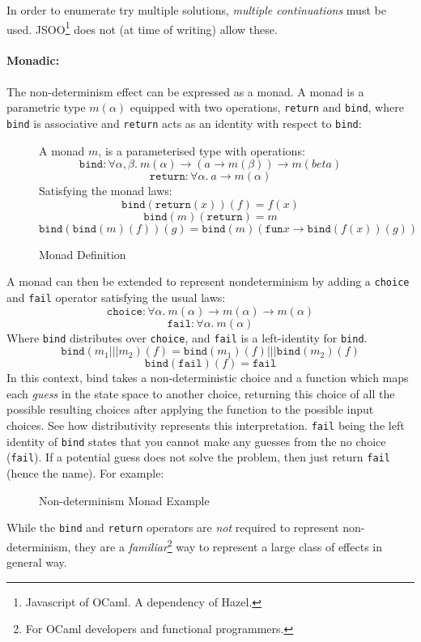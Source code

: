In order to enumerate try multiple solutions, \textit{multiple continuations} must be used. JSOO\footnote{Javascript of OCaml. A dependency of Hazel.} does not (at time of writing) allow these.
\paragraph{Monadic:} The non-determinism effect can be expressed as a monad. A monad is a parametric type $m(\alpha)$ equipped with two operations, \texttt{return} and \texttt{bind}, where \texttt{bind} is associative and \texttt{return} acts as an identity with respect to \texttt{bind}:
\begin{figure}[h]
A monad $m$, is a parameterised type with operations:
\[\texttt{bind} : \forall \alpha, \beta.\ m(\alpha) \to (a \to m(\beta)) \to m(beta)\]
\[\texttt{return} : \forall \alpha.\ a \to m(\alpha)\]
Satisfying the monad laws:
\[\texttt{bind}(\texttt{return}(x))(f) = f(x)\]
\[\texttt{bind}(m)(\texttt{return}) = m\]
\[\texttt{bind}(\texttt{bind}(m)(f))(g) = \texttt{bind}(m)(\texttt{fun} x \to \texttt{bind}(f(x))(g))\]
\caption{Monad Definition}
\end{figure}
A monad can then be extended to represent nondeterminism by adding a \texttt{choice} and \texttt{fail} operator satisfying the usual laws:
\[\texttt{choice} : \forall \alpha.\ m(\alpha) \to m(\alpha) \to m(\alpha)\]
\[\texttt{fail} : \forall \alpha.\ m(\alpha)\]
Where \texttt{bind} distributes over \texttt{choice}, and \texttt{fail} is a left-identity for \texttt{bind}.
\[\texttt{bind}(m_1 \texttt{|||} m_2)(f) = \texttt{bind}(m_1)(f) \texttt{|||} \texttt{bind}(m_2)(f)\]
\[\texttt{bind}(\texttt{fail})(f) = \texttt{fail}\]
In this context, bind takes a non-deterministic choice and a function which maps each \textit{guess} in the state space to another choice, returning this choice of all the possible resulting choices after applying the function to the possible input choices. See how distributivity represents this interpretation. \texttt{fail} being the left identity of \texttt{bind} states that you cannot make any guesses from the no choice (\texttt{fail}). If a potential guess does not solve the problem, then just return \texttt{fail} (hence the name). For example:
\begin{figure}[h]
\caption{Non-determinism Monad Example}
\end{figure}

While the \texttt{bind} and \texttt{return} operators are \textit{not} required to represent non-determinism, they are a \textit{familiar}\footnote{For OCaml developers and functional programmers.} way to represent a large class of effects in general way. 

